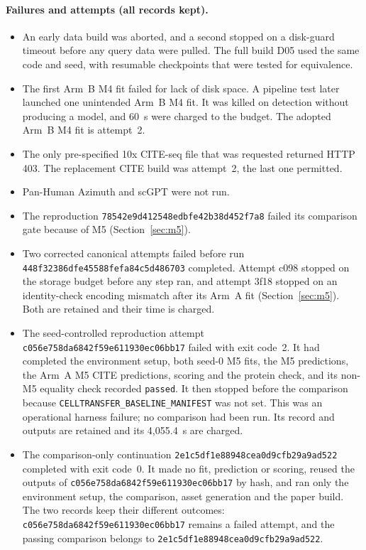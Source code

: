 \documentclass[11pt]{article}
\newcommand{\runid}{\nolinkurl{448f32386dfe45588fefa84c5d486703}}
\newcommand{\failrunid}{\nolinkurl{78542e9d412548edbfe42b38d452f7a8}}
\newcommand{\cfailid}{\nolinkurl{c056e758da6842f59e611930ec06bb17}}
\newcommand{\ccontid}{\nolinkurl{2e1c5df1e88948cea0d9cfb29a9ad522}}
\begin{document}
\paragraph{Failures and attempts (all records kept).}
\begin{itemize}
\item An early data build was aborted, and a second stopped on a disk-guard timeout before any query data were pulled. The full build D05 used the same code and seed, with resumable checkpoints that were tested for equivalence.
\item The first Arm~B M4 fit failed for lack of disk space. A pipeline test later launched one unintended Arm~B M4 fit. It was killed on detection without producing a model, and 60~s were charged to the budget. The adopted Arm~B M4 fit is attempt~2.
\item The only pre-specified 10x CITE-seq file that was requested returned HTTP 403. The replacement CITE build was attempt~2, the last one permitted.
\item Pan-Human Azimuth and scGPT were not run.
\item The reproduction \failrunid{} failed its comparison gate because of M5 (Section~\ref{sec:m5}).
\item Two corrected canonical attempts failed before run \runid{} completed. Attempt c098 stopped on the storage budget before any step ran, and attempt 3f18 stopped on an identity-check encoding mismatch after its Arm~A fit (Section~\ref{sec:m5}). Both are retained and their time is charged.
\item The seed-controlled reproduction attempt \cfailid{} failed with exit code~2. It had completed the environment setup, both seed-0 M5 fits, the M5 predictions, the Arm~A M5 CITE predictions, scoring and the protein check, and its non-M5 equality check recorded \verb|passed|. It then stopped before the comparison because \verb|CELLTRANSFER_BASELINE_MANIFEST| was not set. This was an operational harness failure; no comparison had been run. Its record and outputs are retained and its 4{,}055.4~s are charged.
\item The comparison-only continuation \ccontid{} completed with exit code~0. It made no fit, prediction or scoring, reused the outputs of \cfailid{} by hash, and ran only the environment setup, the comparison, asset generation and the paper build. The two records keep their different outcomes: \cfailid{} remains a failed attempt, and the passing comparison belongs to \ccontid.
\end{itemize}
\end{document}
